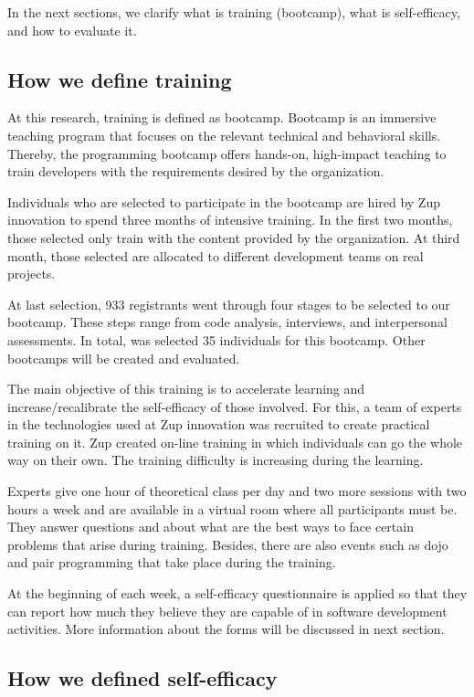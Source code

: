 \documentclass[10pt, conference]{IEEEtran}
\begin{document}
In the next sections, we clarify what is training (bootcamp), what is self-efficacy, and how to evaluate it. 


\subsection{How we define training}
At this research, training is defined as bootcamp. Bootcamp is an immersive teaching program that focuses on the relevant technical and behavioral skills. Thereby, the programming bootcamp offers hands-on, high-impact teaching to train developers with the requirements desired by the organization.

Individuals who are selected to participate in the bootcamp are hired by Zup innovation to spend three months of intensive training. In the first two months, those selected only train with the content provided by the organization. At third month, those selected are allocated to different development teams on real projects.

At last selection, 933 registrants went through four stages to be selected to our bootcamp. These steps range from code analysis, interviews, and interpersonal assessments. In total, was selected 35 individuals for this bootcamp. Other bootcamps will be created and evaluated. 

The main objective of this training is to accelerate learning and increase/recalibrate the self-efficacy of those involved. For this, a team of experts in the technologies used at Zup innovation was recruited to create practical training on it. Zup created on-line training in which individuals can go the whole way on their own. The training difficulty is increasing during the learning. 

Experts give one hour of theoretical class per day and two more sessions with two hours a week and are available in a virtual room where all participants must be. They answer questions and about what are the best ways to face certain problems that arise during training. Besides, there are also events such as dojo and pair programming that take place during the training.

At the beginning of each week, a self-efficacy questionnaire is applied so that they can report how much they believe they are capable of in software development activities. More information about the forms will be discussed in next section.

\subsection{How we defined self-efficacy }
\end{document}

